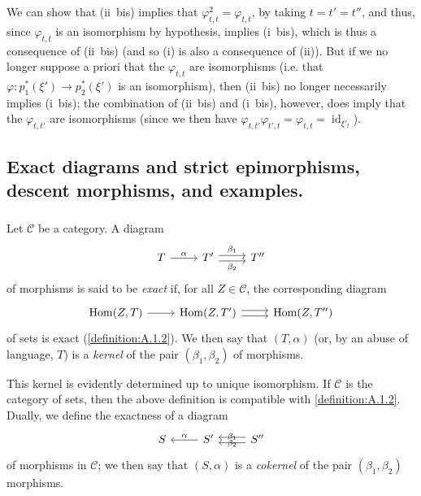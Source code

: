 \documentclass{article}
\theoremstyle{plain}
\theoremstyle{definition}
\newenvironment{definition}[1]
  {\renewcommand\theinnercustomdefinition{#1}\innercustomdefinition}
  {\endinnercustomdefinition}
\newcommand{\cat}[1]{{\mathcal{#1}}}
\DeclareMathOperator{\id}{id}
\DeclareMathOperator{\Hom}{Hom}
\begin{document}
We can show that (ii~bis) implies that $\varphi_{t,t}^2=\varphi_{t,t}$, by taking $t=t'=t''$, and thus, since $\varphi_{t,t}$ is an isomorphism by hypothesis, implies (i~bis), which is thus a consequence of (ii~bis) (and so (i) is also a consequence of (ii)).
But if we no longer suppose a priori that the $\varphi_{t,t}$ are isomorphisms (i.e. that $\varphi\colon p_1^*(\xi')\to p_2^*(\xi')$ is an isomorphism), then (ii~bis) no longer necessarily implies (i~bis);
the combination of (ii~bis) and (i~bis), however, does imply that the $\varphi_{t,t'}$ are isomorphisms (since we then have $\varphi_{t,t'}\varphi_{t',t}=\varphi_{t,t}=\id_{\xi'_t}$).


\subsection{Exact diagrams and strict epimorphisms, descent morphisms, and examples.}
\label{A.2}

\subsubsection{}
\label{A.2.a}

\begin{definition}{2.1}
  Let $\cat{C}$ be a category.
  A diagram
  \[
    \begin{tikzcd}
      T \rar["\alpha"]
      & T' \rar[shift left=1,"\beta_1"] \rar[shift right=1,swap,"\beta_2"]
      & T''
    \end{tikzcd}
  \]
  of morphisms is said to be \emph{exact} if, for all $Z\in\cat{C}$, the corresponding diagram
  \[
    \begin{tikzcd}
      \Hom(Z,T) \rar
      & \Hom(Z,T') \rar[shift left=1] \rar[shift right=1]
      & \Hom(Z,T'')
    \end{tikzcd}
  \]
  of sets is exact (\cref{definition:A.1.2}).
  We then say that $(T,\alpha)$ (or, by an abuse of language, $T$) is a \emph{kernel} of the pair $(\beta_1,\beta_2)$ of morphisms.
\end{definition}

This kernel is evidently determined up to unique isomorphism.
If $\cat{C}$ is the category of sets, then the above definition is compatible with \cref{definition:A.1.2}.
Dually, we define the exactness of a diagram
\[
  \begin{tikzcd}
    S
    & S' \lar[swap,"\alpha"]
    & S''\lar[shift left=1,swap,"\beta_1"] \lar[shift right=1,"\beta_2"]
  \end{tikzcd}
\]
of morphisms in $\cat{C}$;
we then say that $(S,\alpha)$ is a \emph{cokernel} of the pair $(\beta_1,\beta_2)$ morphisms.
\end{document}
